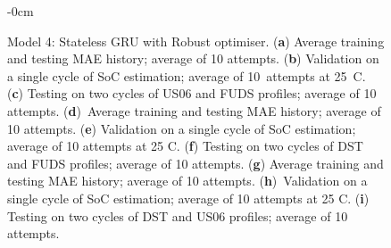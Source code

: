 \begin{figure}[H]
\begin{adjustwidth}{-\extralength}{0cm}
\begin{subfigure}[b]{0.425\textwidth}
    \end{subfigure}
    \hfill
    \begin{subfigure}[b]{0.425\textwidth}
        \centering
        
        \caption{\vspace{+2pt}\centering}
    \end{subfigure}
    \hfill
    \begin{subfigure}[b]{0.425\textwidth}
        \centering
        
        \caption{\vspace{+2pt}\centering}
    \end{subfigure}
    \end{adjustwidth}
    \caption{Model 4: Stateless GRU with Robust optimiser. (\textbf{a}) Average training and testing MAE history; average of 10 attempts. (\textbf{b}) Validation on a single cycle of SoC estimation; average of 10~attempts at 25~\textdegree{}C. (\textbf{c}) Testing on two cycles of US06 and FUDS profiles; average of 10 attempts. (\textbf{d})~Average training and testing MAE history; average of 10 attempts. (\textbf{e}) Validation on a single cycle of SoC estimation; average of 10 attempts at 25 \textdegree{}C. (\textbf{f}) Testing on two cycles of DST and FUDS profiles; average of 10 attempts. (\textbf{g}) Average training and testing MAE history; average of 10 attempts. (\textbf{h})~Validation on a single cycle of SoC estimation; average of 10 attempts at 25 \textdegree{}C. (\textbf{i}) Testing on two cycles of DST and US06 profiles; average of 10 attempts.}
    \label{fig:Model-4res}
\end{figure}
\clearpage
